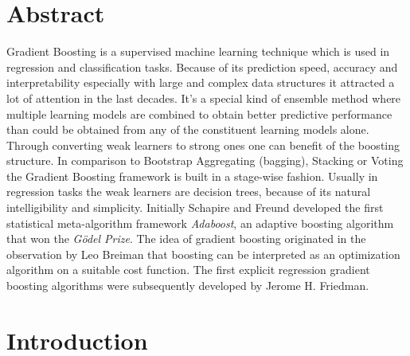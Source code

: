 \documentclass[12pt, a4paper]{article}
\begin{document}
\section*{Abstract}
Gradient Boosting is a supervised machine learning technique which is used in regression and classification tasks. Because of its prediction speed, accuracy and interpretability especially with large and complex data structures it attracted a lot of attention in the last decades. It's a special kind of ensemble method where multiple learning models are combined to obtain better predictive performance than could be obtained from any of the constituent learning models alone. Through converting weak learners to strong ones one can benefit of the boosting structure. In comparison to Bootstrap Aggregating (bagging), Stacking or Voting the Gradient Boosting framework is built in a stage-wise fashion. Usually in regression tasks the weak learners are decision trees, because of its natural intelligibility and simplicity. Initially Schapire and Freund developed the first statistical meta-algorithm framework \textit{Adaboost}, an adaptive boosting algorithm that won the \textit{Gödel Prize}. The idea of gradient boosting originated in the observation by Leo Breiman that boosting can be interpreted as an optimization algorithm on a suitable cost function. The first explicit regression gradient boosting algorithms were subsequently developed by Jerome H. Friedman.
\clearpage
\thispagestyle{empty}
\tableofcontents
\newpage
\clearpage
\setcounter{page}{1}
\section{Introduction}
\end{document}
